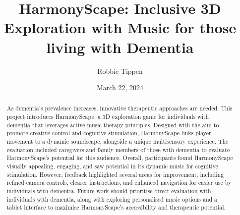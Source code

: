 \documentclass{l4proj}
\begin{document}
\title{HarmonyScape: Inclusive 3D Exploration with Music for those living with Dementia}
\author{Robbie Tippen}
\date{March 22, 2024}

\maketitle

\begin{abstract}
    
    As dementia's prevalence increases, innovative therapeutic approaches are needed. This project introduces HarmonyScape, a 3D exploration game for individuals with dementia that leverages active music therapy principles. Designed with the aim to promote creative control and cognitive stimulation, HarmonyScape links player movement to a dynamic soundscape, alongside a unique multisensory experience. The evaluation included caregivers and family members of those with dementia to evaluate HarmonyScape's potential for this audience. Overall, participants found HarmonyScape visually appealing, engaging, and saw potential in its dynamic music for cognitive stimulation. However, feedback highlighted several areas for improvement, including refined camera controls, clearer instructions, and enhanced navigation for easier use by individuals with dementia. Future work should prioritise direct evaluation with individuals with dementia, along with exploring personalised music options and a tablet interface to maximise HarmonyScape's accessibility and therapeutic potential.
\end{abstract}



%
%
\def\consentname {Robbie Tippen} %
\def\consentdate {27 February 2024} %
%
\educationalconsent
\end{document}
